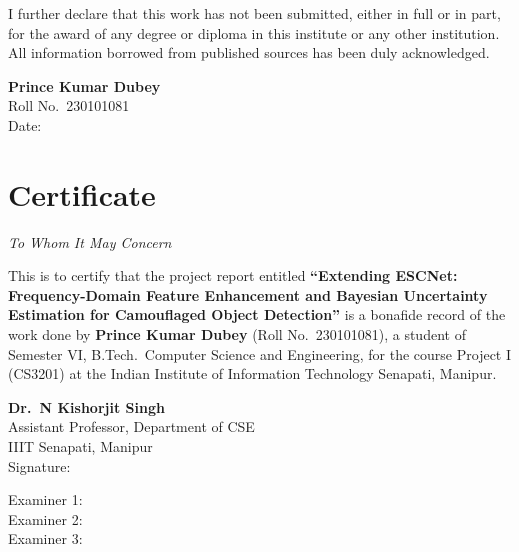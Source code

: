 \documentclass[12pt,a4paper]{report}
\begin{document}
I further declare that this work has not been submitted, either in full or in part, for the award of any degree or diploma in this institute or any other institution. All information borrowed from published sources has been duly acknowledged.

\vspace{2.5cm}
\noindent\textbf{Prince Kumar Dubey}\\
Roll No.\ 230101081\\[10pt]
\noindent Date: \underline{\hspace{5cm}}
\clearpage

\chapter*{Certificate}
\begin{center}{\large\textit{To Whom It May Concern}}\end{center}\vspace{0.4cm}

This is to certify that the project report entitled \textbf{``Extending ESCNet: Frequency-Domain Feature Enhancement and Bayesian Uncertainty Estimation for Camouflaged Object Detection''} is a bonafide record of the work done by \textbf{Prince Kumar Dubey} (Roll No.\ 230101081), a student of Semester VI, B.Tech.\ Computer Science and Engineering, for the course Project I (CS3201) at the Indian Institute of Information Technology Senapati, Manipur.

\vspace{2.5cm}
\begin{flushright}
\textbf{Dr.\ N Kishorjit Singh}\\
Assistant Professor, Department of CSE\\
IIIT Senapati, Manipur\\[8pt]
Signature: \underline{\hspace{5cm}}
\end{flushright}

\vspace{1.2cm}
\noindent Examiner 1:\hspace{0.5cm}\dotfill\\[10pt]
\noindent Examiner 2:\hspace{0.5cm}\dotfill\\[10pt]
\noindent Examiner 3:\hspace{0.5cm}\dotfill
\clearpage
\end{document}
